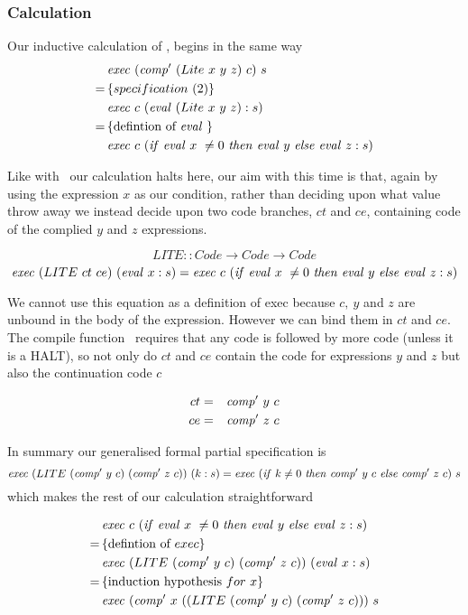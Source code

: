 \documentclass {article}
\begin{document}
\subsubsection{Calculation}

Our inductive calculation of \lite,
begins in the same way
\begin{align*}
	&\mathit{exec\ } (\mathit{comp'\ }  (Lite\ x\ y\ z)\ c)\ s \\
	=\, & \{specification\ (2) \} \\
	&\mathit{exec\ } c\ (\mathit{eval\ }  (Lite\ x\ y\ z) : s) \\
	=\, & \{\mbox{defintion of}\ \mathit{eval\ } \} \\
	&\mathit{exec\ } c\ (\mathit{if\ } \mathit{eval\ }  x\ \not= 0\ \mathit{then\ } \mathit{eval\ }  y\ \mathit{else\ } \mathit{eval\ }  z : s)
\end{align*}

Like with \ite\ our calculation halts here,
our aim with this time is that, again by using
the expression $x$ as our condition,
rather than deciding upon what value throw away
we instead decide upon two code branches, $ct$ and $ce$,
containing code of the complied $y$ and $z$ expressions.

	\[ LITE :: Code \rightarrow Code \rightarrow Code \]
	\[ \mathit{exec\ } (LITE\ ct\ ce)\ (\mathit{eval\ }  x:s) 
	= \mathit{exec\ } c\ (\mathit{if\ } \mathit{eval\ }  x\ \not= 0\ \mathit{then\ } \mathit{eval\ }  y\ \mathit{else\ } \mathit{eval\ }  z : s) \]

We cannot use this equation as a definition of exec 
because $c,\ y$ and $z$ are unbound in the 
body of the expression\cite[page 10]{bandh}.
However we can bind them in $ct$ and $ce$.
The compile function \comp\ requires that any code is followed by
more code (unless it is a HALT),
so not only do  $ct$ and $ce$ contain the code for expressions
 $y$ and $z$ but also the continuation code $c$

\begin{eqnarray*}
	ct &=& \mathit{comp'\ }  y\ c \\
	ce &=& \mathit{comp'\ }  z\ c
\end{eqnarray*}

In summary our generalised formal partial specification is
\begin{equation*}
	\Exec (LITE\ (\Compp  y\ c)\ (\Compp  z\ c) )\ (k:s) 
= \Exec (\ifff k \not= 0\ \tthen \Compp  y\ c\ \eelse \Compp  z\ c)\ s 
\end{equation*}
which makes the rest of our calculation straightforward

\begin{align*}
	&\mathit{exec\ } c\ (\mathit{if\ } \mathit{eval\ }  x\ \not= 0\ \mathit{then\ } \mathit{eval\ }  y\ \mathit{else\ } \mathit{eval\ }  z : s) \\
	=\, & \{\mbox{defintion of}\ exec\} \\
	&\mathit{exec\ } (LITE\ (\mathit{comp'\ }  y\ c)\ (\mathit{comp'\ }  z\ c) )\ (\mathit{eval\ }  x : s) \\
	=\, & \{\mbox{induction hypothesis}\ for\ x\} \\
	&\mathit{exec\ } (\mathit{comp'\ }  x\ ((LITE\ (\mathit{comp'\ }  y\ c)\ (\mathit{comp'\ }  z\ c)))\ s
\end{align*}
\end{document}
